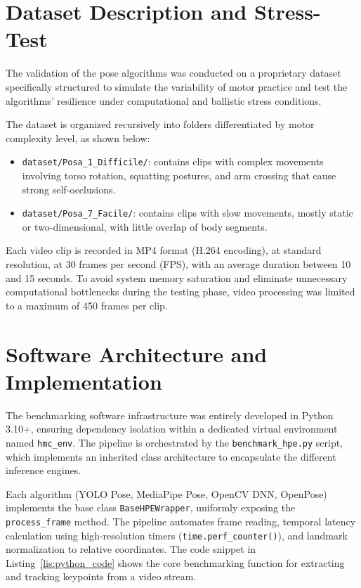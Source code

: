 \documentclass[a4paper,11pt]{article}
\begin{document}
\section{Dataset Description and Stress-Test}
The validation of the pose algorithms was conducted on a proprietary dataset specifically structured to simulate the variability of motor practice and test the algorithms' resilience under computational and ballistic stress conditions.

The dataset is organized recursively into folders differentiated by motor complexity level, as shown below:
\begin{itemize}
    \item \texttt{dataset/Posa\_1\_Difficile/}: contains clips with complex movements involving torso rotation, squatting postures, and arm crossing that cause strong self-occlusions.
    \item \texttt{dataset/Posa\_7\_Facile/}: contains clips with slow movements, mostly static or two-dimensional, with little overlap of body segments.
\end{itemize}
Each video clip is recorded in MP4 format (H.264 encoding), at standard resolution, at 30 frames per second (FPS), with an average duration between 10 and 15 seconds. To avoid system memory saturation and eliminate unnecessary computational bottlenecks during the testing phase, video processing was limited to a maximum of 450 frames per clip.

\section{Software Architecture and Implementation}
The benchmarking software infrastructure was entirely developed in Python 3.10+, ensuring dependency isolation within a dedicated virtual environment named \texttt{hmc\_env}. The pipeline is orchestrated by the \texttt{benchmark\_hpe.py} script, which implements an inherited class architecture to encapsulate the different inference engines.

Each algorithm (YOLO Pose, MediaPipe Pose, OpenCV DNN, OpenPose) implements the base class \texttt{BaseHPEWrapper}, uniformly exposing the \texttt{process\_frame} method. The pipeline automates frame reading, temporal latency calculation using high-resolution timers (\texttt{time.perf\_counter()}), and landmark normalization to relative coordinates. The code snippet in Listing~\ref{lis:python_code} shows the core benchmarking function for extracting and tracking keypoints from a video stream.
\end{document}
